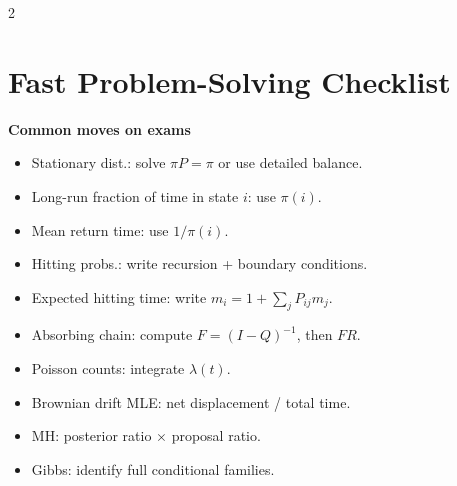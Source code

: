 \documentclass[10pt]{article}
\begin{document}
\begin{multicols}{2}
\section{Fast Problem-Solving Checklist}

\begin{theorembox}
\textbf{Common moves on exams}
\begin{itemize}[leftmargin=12pt,itemsep=1pt]
\item Stationary dist.: solve \(\pi P=\pi\) or use detailed balance.
\item Long-run fraction of time in state \(i\): use \(\pi(i)\).
\item Mean return time: use \(1/\pi(i)\).
\item Hitting probs.: write recursion + boundary conditions.
\item Expected hitting time: write \(m_i=1+\sum_j P_{ij}m_j\).
\item Absorbing chain: compute \(F=(I-Q)^{-1}\), then \(FR\).
\item Poisson counts: integrate \(\lambda(t)\).
\item Brownian drift MLE: net displacement / total time.
\item MH: posterior ratio \(\times\) proposal ratio.
\item Gibbs: identify full conditional families.
\end{itemize}
\end{theorembox}

\end{multicols}
\end{document}
